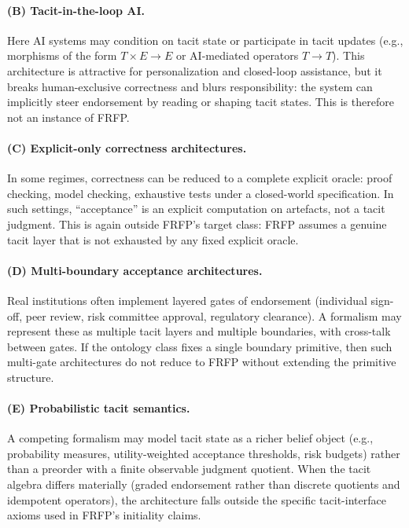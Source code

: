 \paragraph{(B) Tacit-in-the-loop AI.}
Here AI systems may condition on tacit state or participate in tacit updates (e.g., morphisms of the
form \(T\times E\to E\) or AI-mediated operators \(T\to T\)). This architecture is attractive for
personalization and closed-loop assistance, but it breaks human-exclusive correctness and blurs
responsibility: the system can implicitly steer endorsement by reading or shaping tacit states. This
is therefore not an instance of FRFP.

\paragraph{(C) Explicit-only correctness architectures.}
In some regimes, correctness can be reduced to a complete explicit oracle: proof checking, model
checking, exhaustive tests under a closed-world specification. In such settings, ``acceptance'' is an
explicit computation on artefacts, not a tacit judgment. This is again outside FRFP's target class:
FRFP assumes a genuine tacit layer that is not exhausted by any fixed explicit oracle.

\paragraph{(D) Multi-boundary acceptance architectures.}
Real institutions often implement layered gates of endorsement (individual sign-off, peer review,
risk committee approval, regulatory clearance). A formalism may represent these as multiple tacit
layers and multiple boundaries, with cross-talk between gates. If the ontology class fixes a single
boundary primitive, then such multi-gate architectures do not reduce to FRFP without extending the
primitive structure.

\paragraph{(E) Probabilistic tacit semantics.}
A competing formalism may model tacit state as a richer belief object (e.g., probability measures,
utility-weighted acceptance thresholds, risk budgets) rather than a preorder with a finite observable
judgment quotient. When the tacit algebra differs materially (graded endorsement rather than discrete
quotients and idempotent operators), the architecture falls outside the specific tacit-interface axioms
used in FRFP's initiality claims.


